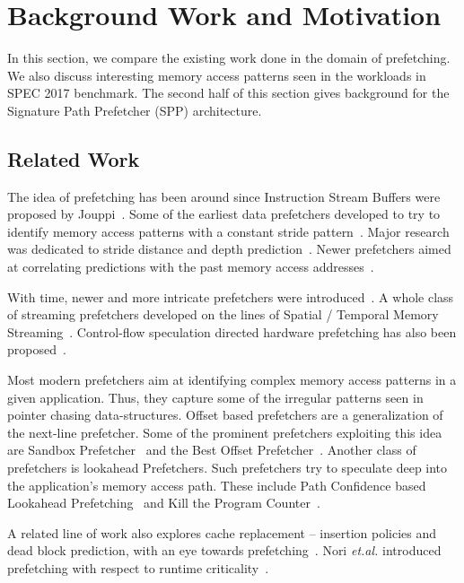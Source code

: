 \section{Background Work and Motivation}
\label{Background}

In this section, we compare the existing work done in the domain of
prefetching.  We also discuss interesting memory access patterns seen in the
workloads in SPEC 2017 benchmark.  The second half of this section gives
background for the Signature Path Prefetcher (SPP) architecture.

\subsection{Related Work}
\label{Background-Related}
The idea of prefetching has been around since Instruction Stream
Buffers were proposed by Jouppi~\cite{ISB}. Some of the earliest data
prefetchers developed to try to identify memory access patterns with a
constant stride pattern~\cite{Smith,Baer,Stride}. Major research was
dedicated to stride distance and depth prediction~\cite{Decoupled,Adaptive}. Newer prefetchers aimed at correlating
predictions with the past memory access addresses~\cite{Address_Correlated,AMPM}.

With time, newer and more intricate prefetchers were
introduced~\cite{Wenisch_Temporal_Streaming,Stealth,Feedback_Directed,Coordinated,Bandwidth_Efficient,Pacman,TLB,Linearizing,Sandbox,VLDP,DoL,Domino}.
A whole class of streaming prefetchers developed on the lines of Spatial /
Temporal Memory
Streaming~\cite{Spatial_Pattern,SMS,Temporal_Instruction_Fetch,Off_Chip,STMS,SMS_JILP}.
Control-flow speculation directed hardware prefetching has also been
proposed~\cite{BFetch,MTBFetch}.

Most modern prefetchers aim at identifying complex memory access patterns in a
given application.  Thus, they capture some of the irregular patterns seen in
pointer chasing data-structures.  Offset based prefetchers are a
generalization of the next-line prefetcher.  Some of the prominent prefetchers
exploiting this idea are Sandbox Prefetcher~\cite{Sandbox} and the Best Offset
Prefetcher~\cite{BOP}.  Another class of prefetchers is lookahead Prefetchers.
Such prefetchers try to speculate deep into the application's memory access
path.  These include Path Confidence based Lookahead Prefetching~\cite{SPP}
and Kill the Program Counter~\cite{KPC}.

A related line of work also explores cache replacement -- insertion policies
and dead block prediction, with an eye towards
prefetching~\cite{DB_Pred,Cache_Burst,KPC,Harmony}.  Nori \textit{et.al.}
introduced prefetching with respect to runtime criticality~\cite{CATCH}.

